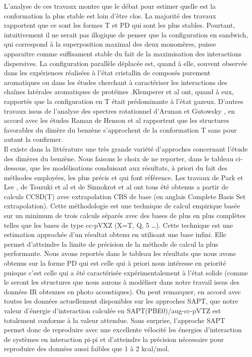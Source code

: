 L’analyse de ces travaux montre que le débat pour estimer quelle est la conformation la plus stable est loin d’être clos. La majorité des travaux rapportent que ce sont les formes T et PD qui sont les plus stables. Pourtant, intuitivement il ne serait pas illogique de penser que la configuration en sandwich, qui correspond à la superposition maximal des deux monomères, puisse apparaitre comme suffisament stable du fait de la maximisation des interactions dispersives. La configuration parallèle déplacée est, quand à elle, souvent observée dans les expériences réalisées à l’état cristallin de composés purement aromatiques \cite{hunter1991pi,fyfe1997synthetic,rebek1996assembly} ou dans les études cherchant à caractériser les interactions des chaînes latérales aromatiques de protéines \cite{hunter1991pi,burley1985aromatic}.Klemperer et al \cite{janda1975benzene} ont, quand à eux, rapportés que la configuration en T était prédominante à l’état gazeux. D’autres travaux issus de l’analyse des spectres rotationnel d'Arunan et Gutowsky \cite{arunan1993rotational}, en accord avec les études Raman de Henson et al \cite{henson1992raman} rapportent que les structures favorables du dimère du benzène s’approchent de la conformation T sans pour autant la confirmer.\\ 
   					
   					
Il existe dans la littérature une très grande variété d’approches concernant l’étude des dimères du benzène. Nous faisons le choix de ne reporter, dans le tableau ci-dessous, que les modélisations conduisant aux résultats, à priori du fait des méthodes employées, les plus précis et qui font référence. Les travaux de Park et Lee \cite{park2006accurate}, de Tsuzuki et al \cite{tsuzuki2002origin} et de Sinnokrot et al \cite{hobza1996potential} ont tous été obtenus a partir de calculs CCSD(T) avec extrapolation CBS de base (en anglais Complete Basis Set extrapolation). Cette méthodologie est une technique de calcul empirique basée sur un minimum de trois calculs séparés avec des bases de plus en plus complètes telles que les bases de type cc-pVXZ (X=T, Q, 5 …). Cette technique est une estimation approchée d’un résultat obtenu en utilisant une base infini. Elle permet d’atteindre la limite de précision de la méthode de calcul la plus performante. Nous avons reportés dans le tableau les résultats que nous avons obtenus sur la forme PD qui est celle qui à priori nous intéresse en priorité puisque c’est celle qui a été caractérisée expérimentalement à l’état solide (comme le seront les structures que nous aurons à modéliser dans notre travail issus des données IR obtenues en photo acoustiques). On peut remarquer, en accord avec toutes les données actuellement disponibles sur les approches SAPT, que notre valeur d’énergie d’interaction calculée en SAPT(PBE0)/aug-cc-pVTZ est totalement conforme à la valeur attendue. Sans surprise, l’approche SAPT permet donc de reproduire avec une excellente vélocité les énergies d’interaction de systèmes en interaction pi-pi et d’atteindre la précision nécessaire pour reproduire des données aussi faibles que 1 à 2 kcal/mol.

